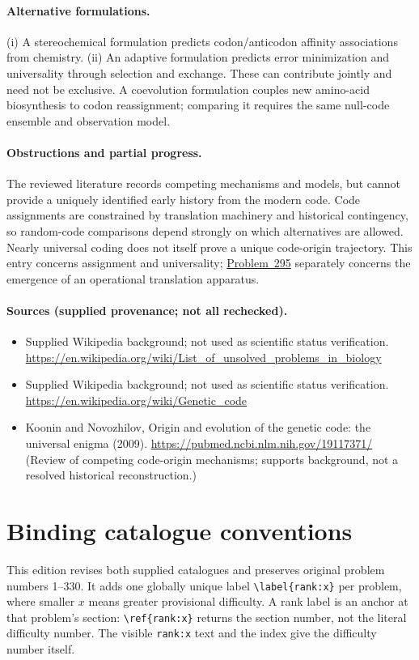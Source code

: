 \documentclass[11pt]{article}
\begin{document}
\paragraph{Alternative formulations.} (i) A stereochemical formulation predicts codon/anticodon affinity associations from chemistry. (ii) An adaptive formulation predicts error minimization and universality through selection and exchange. These can contribute jointly and need not be exclusive. A coevolution formulation couples new amino-acid biosynthesis to codon reassignment; comparing it requires the same null-code ensemble and observation model.

\paragraph{Obstructions and partial progress.} The reviewed literature records competing mechanisms and models, but cannot provide a uniquely identified early history from the modern code. Code assignments are constrained by translation machinery and historical contingency, so random-code comparisons depend strongly on which alternatives are allowed. Nearly universal coding does not itself prove a unique code-origin trajectory. This entry concerns assignment and universality; \href{https://we-solve.github.io/problems/rna-to-protein-transition-df03f191/}{Problem~295} separately concerns the emergence of an operational translation apparatus.

\paragraph{Sources (supplied provenance; not all rechecked).} \begin{itemize}
\item Supplied Wikipedia background; not used as scientific status verification. \url{https://en.wikipedia.org/wiki/List_of_unsolved_problems_in_biology}
\item Supplied Wikipedia background; not used as scientific status verification. \url{https://en.wikipedia.org/wiki/Genetic_code}
\item Koonin and Novozhilov, Origin and evolution of the genetic code: the universal enigma (2009). \url{https://pubmed.ncbi.nlm.nih.gov/19117371/} (Review of competing code-origin mechanisms; supports background, not a resolved historical reconstruction.)
\end{itemize}


\section*{Binding catalogue conventions}
This edition revises both supplied catalogues and preserves original problem numbers 1--330. It adds one globally unique label \verb|\label{rank:x}| per problem, where smaller $x$ means greater provisional difficulty. A rank label is an anchor at that problem's section: \verb|\ref{rank:x}| returns the section number, not the literal difficulty number. The visible \texttt{rank:x} text and the index give the difficulty number itself.
\end{document}
